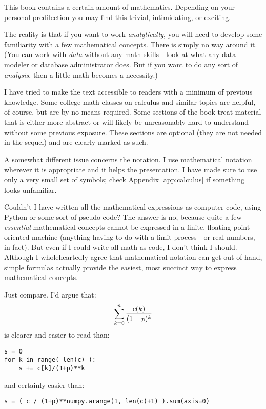 This book contains a certain amount of mathematics. Depending on your
personal predilection you may find this trivial, intimidating,
or exciting.

The reality is that if you want to work \emph{analytically}, you will
need to develop some familiarity with a few mathematical concepts.
There is simply no way around it. (You can work with \emph{data}
without any math skills---look at what any data modeler or database
administrator does. But if you want to do any sort of \emph{analysis},
then a little math becomes a necessity.)

I have tried to make the text accessible to readers with a minimum of
previous knowledge. Some college math classes on calculus and similar
topics are helpful, of course, but are by no means required. Some
sections of the book treat material that is either more abstract or
will likely be unreasonably hard to understand without some previous
exposure.  These sections are optional (they are not needed in the
sequel) and are clearly marked as such.

A somewhat different issue concerns the notation. I use mathematical
notation wherever it is appropriate and it helps the presentation.  I
have made sure to use only a very small set of symbols; check
Appendix \ref{app:calculus} if something looks unfamiliar.

Couldn't I have written all the mathematical expressions as computer
code, using Python or some sort of pseudo-code? The answer is no,
because quite a few \emph{essential} mathematical concepts cannot be
expressed in a finite, floating-point oriented machine (anything
having to do with a limit process---or real numbers, in fact). But
even if I could write all math as code, I don't think I should.
Although I wholeheartedly agree that mathematical notation can get out
of hand, simple formulas actually provide the easiest, most succinct
way to express mathematical concepts.\pagebreak

Just compare. I'd argue that:\vspace*{-3pt}
%
\[
\sum_{k=0}^n \frac{c(k)}{(1+p)^k}\vspace*{-3pt}
\]
%
is clearer and easier to read than:\vspace*{-3pt}
%
\begin{verbatim}
s = 0
for k in range( len(c) ):
    s += c[k]/(1+p)**k
\end{verbatim}\vspace*{-3pt}
%
and certainly easier than:
%
\begin{verbatim}
s = ( c / (1+p)**numpy.arange(1, len(c)+1) ).sum(axis=0)
\end{verbatim}

